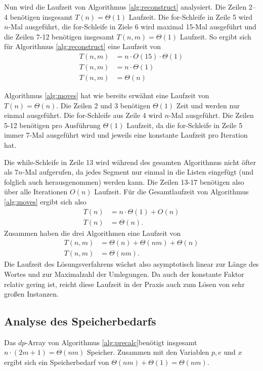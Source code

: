 \documentclass[a4paper,10pt,ngerman]{scrartcl}
\begin{document}
Nun wird die Laufzeit von Algorithmus \ref{alg:reconstruct} analysiert.
Die Zeilen 2--4 benötigen insgesamt $T(n) = \Theta(1)$ Laufzeit. 
Die for-Schleife in Zeile 5 wird $n$-Mal ausgeführt, die for-Schleife in Ziele 6 wird maximal 15-Mal ausgeführt und die Zeilen 7-12 benötigen insgesamt $T(n,m) = \Theta(1)$ Laufzeit. 
So ergibt sich für Algorithmus \ref{alg:reconstruct} eine Laufzeit von 
\begin{align*}
    T(n,m) &= n \cdot O(15) \cdot \Theta(1)\\
    T(n, m) &= n \cdot \Theta(1)\\
    T(n, m) &= \Theta(n)
\end{align*}

Algorithmus \ref{alg:moves} hat wie bereits erwähnt eine Laufzeit von $T(n) = \Theta(n)$. Die Zeilen 2 und 3 benötigen $\Theta(1)$ Zeit und werden nur einmal ausgeführt. 
Die for-Schleife aus Zeile 4 wird $n$-Mal ausgeführt. 
Die Zeilen 5-12 benötigen pro Ausführung $\Theta(1)$ Laufzeit, da die for-Schleife in Zeile 5 immer 7-Mal ausgeführt wird und jeweils eine konstante Laufzeit pro Iteration hat. 

Die while-Schleife in Zeile 13 wird während des gesamten Algorithmus nicht öfter als $7n$-Mal aufgerufen, da jedes Segment nur einmal in die Listen eingefügt (und folglich auch herausgenommen) werden kann. Die Zeilen 13-17 benötigen also über alle Iterationen $O(n)$ Laufzeit.
Für die Gesamtlaufzeit von Algorithmus \ref{alg:moves} ergibt sich also 
\begin{align*}
    T(n) &= n \cdot \Theta(1) + O(n)\\
    T(n) &= \Theta(n).
\end{align*}
Zusammen haben die drei Algorithmen eine Laufzeit von 
\begin{align*}
    T(n, m) &= \Theta(n) + \Theta(nm) + \Theta(n)\\
    T(n, m) &= \Theta(nm).
\end{align*}
Die Laufzeit des Lösungsverfahrens wächst also asymptotisch linear zur Länge des Wortes und zur Maximalzahl der Umlegungen. 
Da auch der konstante Faktor relativ gering ist, reicht diese Laufzeit in der Praxis auch zum Lösen von sehr großen Instanzen.

\subsection{Analyse des Speicherbedarfs}
Das $dp$-Array von Algorithmus \ref{alg:precalc}benötigt insgesamt $n \cdot (2m + 1) = \Theta(nm)$ Speicher. Zusammen mit den Variablen $p, e$ und $x$ ergibt sich ein Speicherbedarf von $\Theta(nm) + \Theta(1) = \Theta(nm)$.
\end{document}
